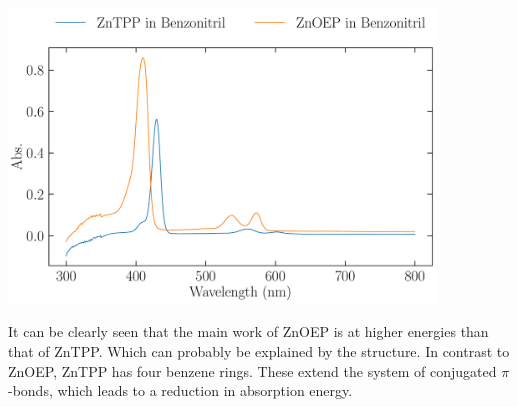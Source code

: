 \begin{center}
    \captionsetup{type = figure}
    \includegraphics[width = 0.85\textwidth]{Pictures/Evaluation/41/ZnTpp-ZnOEP-in-Bn.pdf}
    \label{fig:uv-visZinc}
\end{center}

It can be clearly seen that the main work of ZnOEP is at higher energies than that of ZnTPP. Which can probably be explained by the structure. In contrast to ZnOEP, ZnTPP has four benzene rings. These extend the system of conjugated $\pi$-bonds, which leads to a reduction in absorption energy.
